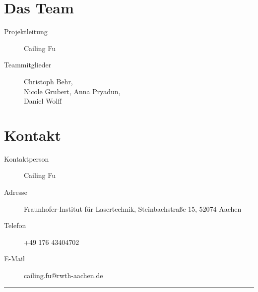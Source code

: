 \documentclass[a4paper,12pt,notumble]{leaflet}
\begin{document}
\noindent
\begin{minipage}[c][0.58\textheight][t]{\textwidth}
	\section{Das Team}
	\begin{description}
		\item[Projektleitung] Cailing Fu
		\item[Teammitglieder] Christoph Behr, \\ Nicole Grubert, Anna Pryadun, \\ Daniel Wolff
	\end{description}

	\section{Kontakt}
	\begin{description}
		\item[Kontaktperson] Cailing Fu 
		\item[Adresse] Fraunhofer-Institut für Lasertechnik, Steinbachstraße 15, 52074 Aachen
		\item[Telefon] +49 176 43404702
		\item[E-Mail] cailing.fu@rwth-aachen.de
	\end{description}
\end{minipage}

\textcolor{rwth-lblue}{\noindent\rule{\textwidth}{4pt}}
\end{document}
